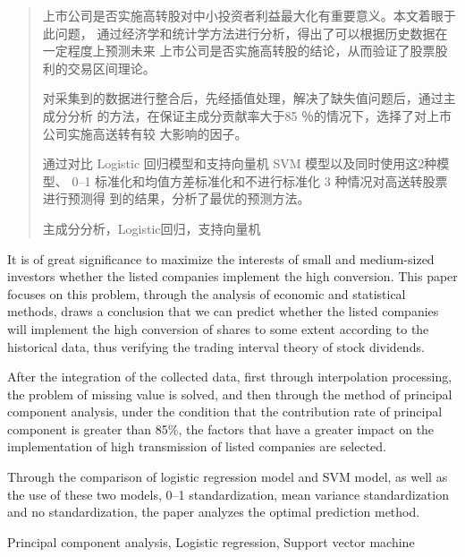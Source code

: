 \documentclass[../main]{subfiles}
\begin{document}
\begin{abstract}
  上市公司是否实施高转股对中小投资者利益最大化有重要意义。本文着眼于此问题，
  通过经济学和统计学方法进行分析，得出了可以根据历史数据在一定程度上预测未来
  上市公司是否实施高转股的结论，从而验证了股票股利的交易区间理论。

  对采集到的数据进行整合后，先经插值处理，解决了缺失值问题后，通过主成分分析
  的方法，在保证主成分贡献率大于85 ％的情况下，选择了对上市公司实施高送转有较
  大影响的因子。

  通过对比 Logistic 回归模型和支持向量机 SVM 模型以及同时使用这2种模型、 0--1
  标准化和均值方差标准化和不进行标准化 3 种情况对高送转股票进行预测得
  到的结果，分析了最优的预测方法。

  \begin{keyword}
    主成分分析，Logistic回归，支持向量机
  \end{keyword}
\end{abstract}

\begin{abstract*}
  It is of great significance to maximize the interests of small and
  medium-sized investors whether the listed companies implement the high
  conversion. This paper focuses on this problem, through the analysis of
  economic and statistical methods, draws a conclusion that we can predict
  whether the listed companies will implement the high conversion of shares
  to some extent according to the historical data, thus verifying the trading
  interval theory of stock dividends.

  After the integration of the collected data, first through interpolation
  processing, the problem of missing value is solved, and then through the
  method of principal component analysis, under the condition that the
  contribution rate of principal component is greater than 85\%, the factors
  that have a greater impact on the implementation of high transmission of
  listed companies are selected.

  Through the comparison of logistic regression model and SVM model, as well
  as the use of these two models, 0--1 standardization, mean variance
  standardization and no standardization, the paper analyzes the optimal
  prediction method.

  \begin{keyword*}
    Principal component analysis, Logistic regression, Support vector machine
  \end{keyword*}
\end{abstract*}
\end{document}
